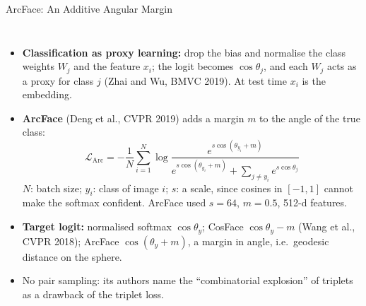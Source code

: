 \begin{frame}{ArcFace: An Additive Angular Margin}
  \begin{columns}[T,onlytextwidth]
      \begin{itemize}\footnotesize\itemsep0.3em
        \item \textbf{Classification as proxy learning:} drop the bias and normalise the class weights $W_j$ and the feature $x_i$; the logit becomes $\cos\theta_j$, and each $W_j$ acts as a proxy for class $j$ (Zhai and Wu, BMVC 2019). At test time $x_i$ is the embedding.
        \item \textbf{ArcFace} (Deng et al., CVPR 2019) adds a margin $m$ to the angle of the true class:
        \[ \mathcal{L}_{\text{Arc}}=-\frac{1}{N}\sum_{i=1}^{N}\log\frac{e^{s\cos(\theta_{y_i}+m)}}{e^{s\cos(\theta_{y_i}+m)}+\sum_{j\neq y_i}e^{s\cos\theta_j}} \]
        $N$: batch size; $y_i$: class of image $i$; $s$: a scale, since cosines in $[-1,1]$ cannot make the softmax confident. ArcFace used $s=64$, $m=0.5$, 512-d features.
        \item \textbf{Target logit:} normalised softmax $\cos\theta_y$; CosFace $\cos\theta_y-m$ (Wang et al., CVPR 2018); ArcFace $\cos(\theta_y+m)$, a margin in angle, i.e.\ geodesic distance on the sphere.
        \item No pair sampling: its authors name the ``combinatorial explosion'' of triplets as a drawback of the triplet loss.
      \end{itemize}
      \centering
      \vspace{0.4em}
\end{columns}
\end{frame}
